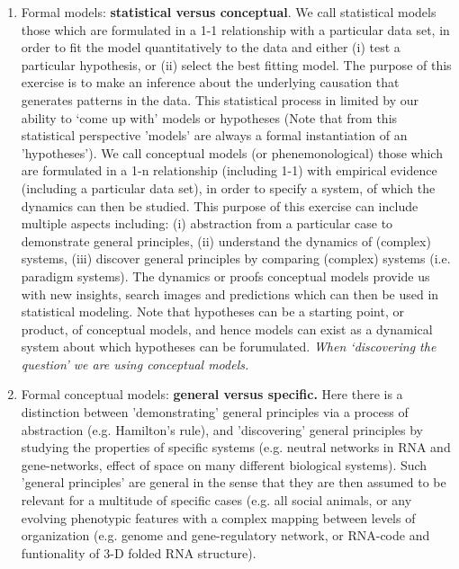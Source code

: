 \begin{enumerate}
\item Formal models:\textbf{ statistical versus conceptual}. We call statistical models those which are formulated in a 1-1 relationship with a particular data set, in order to fit the model quantitatively to the data and either (i) test a particular hypothesis, or (ii) select the best fitting model. The purpose of this exercise is to make an inference about the underlying causation that generates patterns in the data. This statistical process in limited by our ability to `come up with' models or hypotheses (Note that from this statistical perspective 'models' are always a formal instantiation of an 'hypotheses'). We call conceptual models (or phenemonological) those which are formulated in a 1-n relationship (including 1-1) with empirical evidence (including a particular data set), in order to specify a system, of which the dynamics can then be studied. This purpose of this exercise can include multiple aspects including: (i) abstraction from a particular case to demonstrate general principles, (ii) understand the dynamics of (complex) systems, (iii) discover general principles by comparing (complex) systems (i.e. paradigm systems). The dynamics or proofs conceptual models provide us with new insights, search images and predictions which can then be used in statistical modeling. Note that hypotheses can be a starting point, or product, of conceptual models, and hence models can exist as a dynamical system about which hypotheses can be forumulated. \textit{When `discovering the question' we are using conceptual models.}
\item Formal conceptual models: \textbf{general versus specific.} Here there is a distinction between 'demonstrating' general principles via a process of abstraction (e.g. Hamilton's rule), and 'discovering' general principles by studying the properties of specific systems (e.g. neutral networks in RNA and gene-networks, effect of space on many different biological systems). Such 'general principles' are general in the sense that they are then assumed to be relevant for a multitude of specific cases (e.g. all social animals, or any evolving phenotypic features with a complex mapping between levels of organization (e.g. genome and gene-regulatory network, or RNA-code and funtionality of 3-D folded RNA structure).
\end{enumerate}
  
  
  
  